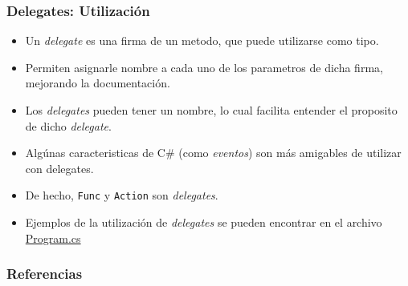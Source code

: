 \documentclass{beamer}
\begin{document}
\begin{frame}
    \frametitle{Delegates: Utilizaci\'on}
    \begin{itemize}
        \item{Un \emph{delegate} es una firma de un metodo, que puede
        utilizarse como tipo.}
        \item{Permiten asignarle nombre a cada uno de los parametros
        de dicha firma, mejorando la documentaci\'on.}
        \item{Los \emph{delegates} pueden tener un nombre, lo cual
        facilita entender el proposito de dicho \emph{delegate}.}
        \item{Alg\'unas caracteristicas de C\# (como \emph{eventos})
        son m\'as amigables de utilizar con delegates.}
        \item{De hecho, \texttt{Func} y \texttt{Action} son \emph{delegates}.}
        \item{Ejemplos de la utilizaci\'on de \emph{delegates} se pueden encontrar
        en el archivo \href{run:../Ejemplos/Lambdas/Program.cs}{Program.cs}}
    \end{itemize}
\end{frame}

\begin{frame}
    \frametitle{Referencias}
    
    
\end{frame}
\end{document}
